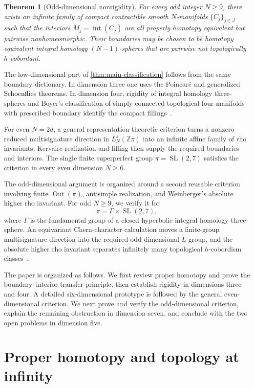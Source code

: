 \documentclass[10pt,reqno]{amsart}
\numberwithin{equation}{section}
\newtheorem{maintheorem}{Theorem}
\theoremstyle{definition}
\theoremstyle{remark}
\newcommand{\Z}{\mathbb Z}
\newcommand{\Out}{\operatorname{Out}}
\newcommand{\Int}{\operatorname{int}}
\newcommand{\SL}{\operatorname{SL}}
\begin{document}
\begin{maintheorem}[Odd-dimensional nonrigidity]
\label{thm:odd-main}
For every odd integer \(N\geq9\), there exists an infinite family of
compact contractible smooth \(N\)-manifolds \(\{C_j\}_{j\in J}\) such
that the interiors \(M_j=\Int(C_j)\) are all properly homotopy
equivalent but pairwise nonhomeomorphic.  Their boundaries may be
chosen to be homotopy equivalent integral homology \((N-1)\)-spheres
that are pairwise not topologically \(h\)-cobordant.
\end{maintheorem}

The low-dimensional part of \cref{thm:main-classification} follows
from the same boundary dictionary.  In dimension three one uses the
Poincar\'e and generalized Schoenflies theorems.  In dimension four,
rigidity of integral homology three-spheres and Boyer's classification
of simply connected topological four-manifolds with prescribed
boundary identify the compact fillings~\cite{BoyerBoundary}.

For even \(N=2d\), a general representation-theoretic criterion turns
a nonzero reduced multisignature direction in \(L_N^s(\Z\pi)\) into an
infinite affine family of rho invariants.  Kervaire realization and
filling then supply the required boundaries and interiors.  The single
finite superperfect group \(\pi=\SL(2,7)\) satisfies the criterion in
every even dimension \(N\geq6\).

The odd-dimensional argument is organized around a second reusable
criterion involving finite \(\Out(\pi)\), antisimple realization, and
Weinberger's absolute higher rho invariant.  For odd \(N\geq9\), we
verify it for
\[
\pi=\Gamma\times\SL(2,7),
\]
where \(\Gamma\) is the fundamental group of a closed hyperbolic
integral homology three-sphere.  An equivariant Chern-character
calculation moves a finite-group multisignature direction into the
required odd-dimensional \(L\)-group, and the absolute higher rho
invariant separates infinitely many topological \(h\)-cobordism
classes~\cite{WeinbergerRho,DFW}.

The paper is organized as follows.  We first review proper homotopy and
prove the boundary--interior transfer principle, then establish
rigidity in dimensions three and four.  A detailed six-dimensional
prototype is followed by the general even-dimensional criterion.  We
next prove and verify the odd-dimensional criterion, explain the
remaining obstruction in dimension seven, and conclude with the two
open problems in dimension five.

\section{Proper homotopy and topology at infinity}
\label{sec:proper-preliminaries}
\end{document}
